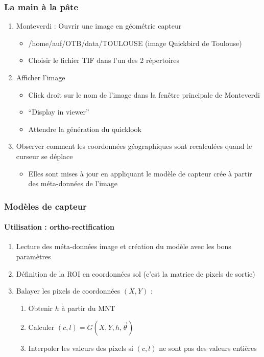 \documentclass[compress,handout]{beamer}
\begin{document}
\begin{frame}
\frametitle{La main à la pâte}
\begin{enumerate}
\item Monteverdi : Ouvrir une image en géométrie capteur
  \begin{itemize}
  \item /home/auf/OTB/data/TOULOUSE (image Quickbird de Toulouse)
  \item Choisir le fichier TIF dans l'un des 2 répertoires
  \end{itemize}
\item Afficher l'image
  \begin{itemize}
  \item Click droit sur le nom de l'image dans la fenêtre principale
    de Monteverdi
  \item ``Display in viewer''
  \item Attendre la génération du quicklook
  \end{itemize}
\item Observer comment les coordonnées géographiques sont recalculées
  quand le curseur se déplace
  \begin{itemize}
  \item Elles sont mises à jour en appliquant le modèle de capteur
    crée à partir des méta-données de l'image
  \end{itemize}
\end{enumerate}
\end{frame}

\begin{frame}
  \frametitle{Modèles de capteur}

  \framesubtitle{Utilisation : ortho-rectification}
  \begin{enumerate}
    \item Lecture des méta-données image et création du modèle avec
      les bons paramètres
  \item Définition de la ROI en coordonnées sol (c'est la matrice de
    pixels de sortie)
  \item Balayer les pixels de coordonnées $(X,Y)$ :
    \begin{enumerate}
      \item Obtenir $h$ à partir du MNT
      \item Calculer $(c,l) = G(X,Y,h,\vec\theta)$
      \item Interpoler les valeurs des pixels si $(c,l)$ ne sont pas
        des valeurs entières
    \end{enumerate}
  \end{enumerate}
\end{frame}
\end{document}
